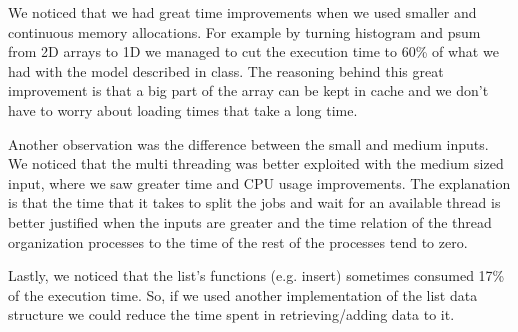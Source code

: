 \documentclass{ws-ijprai}
\begin{document}
\tab We noticed that we had great time improvements when we used smaller and continuous memory allocations. For example by turning histogram and psum from 2D arrays to 1D we managed to cut the execution time to 60\% of what we had with the model described in class. The reasoning behind this great improvement is that a big part of the array can be kept in cache and we don't have to worry about loading times that take a long time.

\tab Another observation was the difference between the small and medium inputs. We noticed that the multi threading was better exploited with the medium sized input, where we saw greater time and CPU usage improvements. The explanation is that the time that it takes to split the jobs and wait for an available thread is better justified when the inputs are greater and the time relation of the thread organization processes to the time of the rest of the processes tend to zero.

\tab Lastly, we noticed that the list's functions (e.g. insert) sometimes consumed 17\% of the execution time. So, if we used another implementation of the list data structure we could reduce the time spent in retrieving/adding data to it.
\end{document}

